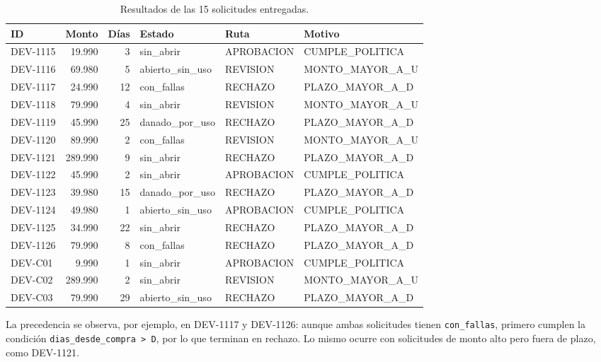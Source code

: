 \documentclass[11pt,a4paper]{article}
\newcommand{\code}[1]{\texttt{#1}}
\begin{document}
\begin{landscape}
\begin{table}[p]
\centering
\scriptsize
\begin{tabular}{@{}l r r l l l@{}}
\toprule
\textbf{ID} & \textbf{Monto} & \textbf{Días} & \textbf{Estado} & \textbf{Ruta} & \textbf{Motivo} \\
\midrule
DEV-1115 & 19.990 & 3 & sin\_abrir & APROBACION & CUMPLE\_POLITICA \\
DEV-1116 & 69.980 & 5 & abierto\_sin\_uso & REVISION & MONTO\_MAYOR\_A\_U \\
DEV-1117 & 24.990 & 12 & con\_fallas & RECHAZO & PLAZO\_MAYOR\_A\_D \\
DEV-1118 & 79.990 & 4 & sin\_abrir & REVISION & MONTO\_MAYOR\_A\_U \\
DEV-1119 & 45.990 & 25 & danado\_por\_uso & RECHAZO & PLAZO\_MAYOR\_A\_D \\
DEV-1120 & 89.990 & 2 & con\_fallas & REVISION & MONTO\_MAYOR\_A\_U \\
DEV-1121 & 289.990 & 9 & sin\_abrir & RECHAZO & PLAZO\_MAYOR\_A\_D \\
DEV-1122 & 45.990 & 2 & sin\_abrir & APROBACION & CUMPLE\_POLITICA \\
DEV-1123 & 39.980 & 15 & danado\_por\_uso & RECHAZO & PLAZO\_MAYOR\_A\_D \\
DEV-1124 & 49.980 & 1 & abierto\_sin\_uso & APROBACION & CUMPLE\_POLITICA \\
DEV-1125 & 34.990 & 22 & sin\_abrir & RECHAZO & PLAZO\_MAYOR\_A\_D \\
DEV-1126 & 79.990 & 8 & con\_fallas & RECHAZO & PLAZO\_MAYOR\_A\_D \\
DEV-C01 & 9.990 & 1 & sin\_abrir & APROBACION & CUMPLE\_POLITICA \\
DEV-C02 & 289.990 & 2 & sin\_abrir & REVISION & MONTO\_MAYOR\_A\_U \\
DEV-C03 & 79.990 & 29 & abierto\_sin\_uso & RECHAZO & PLAZO\_MAYOR\_A\_D \\
\bottomrule
\end{tabular}
\caption{Resultados de las 15 solicitudes entregadas.}
\end{table}
\end{landscape}

La precedencia se observa, por ejemplo, en DEV-1117 y DEV-1126: aunque ambas solicitudes tienen \code{con\_fallas}, primero cumplen la condición \code{dias\_desde\_compra > D}, por lo que terminan en rechazo. Lo mismo ocurre con solicitudes de monto alto pero fuera de plazo, como DEV-1121.
\end{document}
